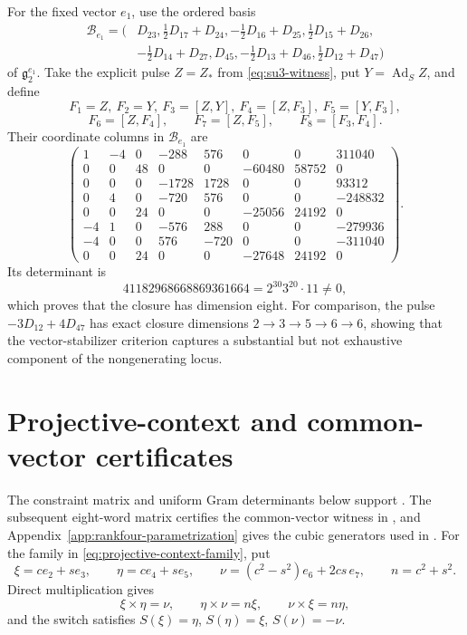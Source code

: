 \documentclass[11pt,a4paper]{article}
\newcommand{\Ad}{\operatorname{Ad}}
\begin{document}
For the fixed vector $e_1$, use the ordered basis
\begin{align*}
\mathcal B_{e_1}=(&D_{23},\tfrac12D_{17}+D_{24},-\tfrac12D_{16}+D_{25},
\tfrac12D_{15}+D_{26},\\
&-\tfrac12D_{14}+D_{27},D_{45},-\tfrac12D_{13}+D_{46},
\tfrac12D_{12}+D_{47})
\end{align*}
of $\mathfrak g_2^{e_1}$.  Take the explicit pulse $Z=Z_*$ from \eqref{eq:su3-witness}, put $Y=\Ad_SZ$, and define
\[
F_1=Z,\ F_2=Y,\ F_3=[Z,Y],\ F_4=[Z,F_3],\ F_5=[Y,F_3],
\]
\[
F_6=[Z,F_4],\qquad F_7=[Z,F_5],\qquad F_8=[F_3,F_4].
\]
Their coordinate columns in $\mathcal B_{e_1}$ are
\[
\begin{pmatrix}
1&-4&0&-288&576&0&0&311040\\
0&0&48&0&0&-60480&58752&0\\
0&0&0&-1728&1728&0&0&93312\\
0&4&0&-720&576&0&0&-248832\\
0&0&24&0&0&-25056&24192&0\\
-4&1&0&-576&288&0&0&-279936\\
-4&0&0&576&-720&0&0&-311040\\
0&0&24&0&0&-27648&24192&0
\end{pmatrix}.
\]
Its determinant is
\[
41182968668869361664=2^{30}3^{20}\cdot11\ne0,
\]
which proves that the closure has dimension eight.  For comparison, the pulse $-3D_{12}+4D_{47}$ has exact closure dimensions $2\to3\to5\to6\to6$, showing that the vector-stabilizer criterion captures a substantial but not exhaustive component of the nongenerating locus.

\section{Projective-context and common-vector certificates}
\label{app:projective-failure-certificates}

The constraint matrix and uniform Gram determinants below support
.
The subsequent eight-word matrix certifies the common-vector witness in
, and Appendix~\ref{app:rankfour-parametrization}
gives the cubic generators used in .
For the family in \eqref{eq:projective-context-family}, put
\[
\xi=ce_2+se_3,
\qquad \eta=ce_4+se_5,
\qquad \nu=(c^2-s^2)e_6+2cs\,e_7,
\qquad n=c^2+s^2.
\]
Direct multiplication gives
\[
\xi\times\eta=\nu,
\qquad \eta\times\nu=n\xi,
\qquad \nu\times\xi=n\eta,
\]
and the switch satisfies $S(\xi)=\eta$, $S(\eta)=\xi$, $S(\nu)=-\nu$.
\end{document}
